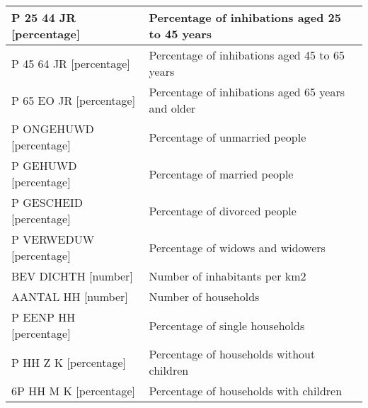 \documentclass[a4paper,twoside,11pt]{article}
\begin{document}
\begin{center}
\begin{tabular}{ | p{4.9cm} | p{10cm} |}
        P 25 44 JR [percentage] & Percentage of inhibations aged 25 to 45 years \\ \hline
        P 45 64 JR [percentage] & Percentage of inhibations aged 45 to 65 years \\ \hline
        P 65 EO JR [percentage] & Percentage of inhibations aged 65 years and older \\ \hline
        P ONGEHUWD [percentage] & Percentage of unmarried people \\ \hline
        P GEHUWD [percentage] & Percentage of married people \\ \hline
        P GESCHEID [percentage] & Percentage of divorced people \\ \hline
        P VERWEDUW [percentage] & Percentage of widows and widowers \\ \hline
        BEV DICHTH [number] & Number of inhabitants per km2 \\ \hline
        AANTAL HH [number] & Number of households \\ \hline
        P EENP HH [percentage] & Percentage of single households \\ \hline
        P HH Z K [percentage] & Percentage of households without children \\ \hline
        6P HH M K [percentage] & Percentage of households with children \\ \hline
    \end{tabular}
\end{center}
\end{document}
